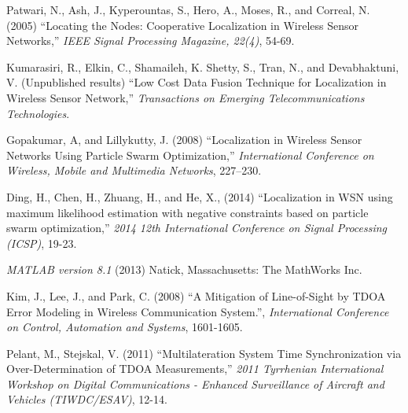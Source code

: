 \documentclass[12pt]{uthesis-v12}  %
\begin{document}
\begin{thebibliography}{00}
Patwari, N., Ash, J., Kyperountas, S., Hero, A., Moses, R., and Correal, N. (2005) ``Locating the Nodes: Cooperative Localization in Wireless Sensor Networks,'' {\it IEEE Signal Processing Magazine, 22(4)}, 54-69.

Kumarasiri, R., Elkin, C., Shamaileh, K. Shetty, S., Tran, N., and Devabhaktuni, V. (Unpublished results) ``Low Cost Data Fusion Technique for Localization in Wireless Sensor Network,'' {\it Transactions on Emerging Telecommunications Technologies}.


Gopakumar, A, and Lillykutty, J. (2008) ``Localization in Wireless Sensor Networks Using Particle Swarm Optimization,'' {\it International Conference on Wireless, Mobile and Multimedia Networks}, 227--230. 

Ding, H., Chen, H., Zhuang, H., and He, X., (2014) ``Localization in WSN using maximum likelihood estimation with negative constraints based on particle swarm optimization,'' {\it 2014 12th International Conference on Signal Processing (ICSP)}, 19-23.


{\it MATLAB version 8.1} (2013) Natick, Massachusetts: The MathWorks Inc.

 Kim, J., Lee, J., and Park, C. (2008) ``A Mitigation of Line-of-Sight by TDOA Error Modeling in Wireless Communication System.'', {\it International Conference on Control, Automation and Systems}, 1601-1605.



Pelant, M., Stejskal, V. (2011) ``Multilateration System Time Synchronization via Over-Determination of TDOA Measurements,'' {\it 2011 Tyrrhenian International Workshop on Digital Communications - Enhanced Surveillance of Aircraft and Vehicles (TIWDC/ESAV)}, 12-14.


\end{thebibliography}
\end{document}
